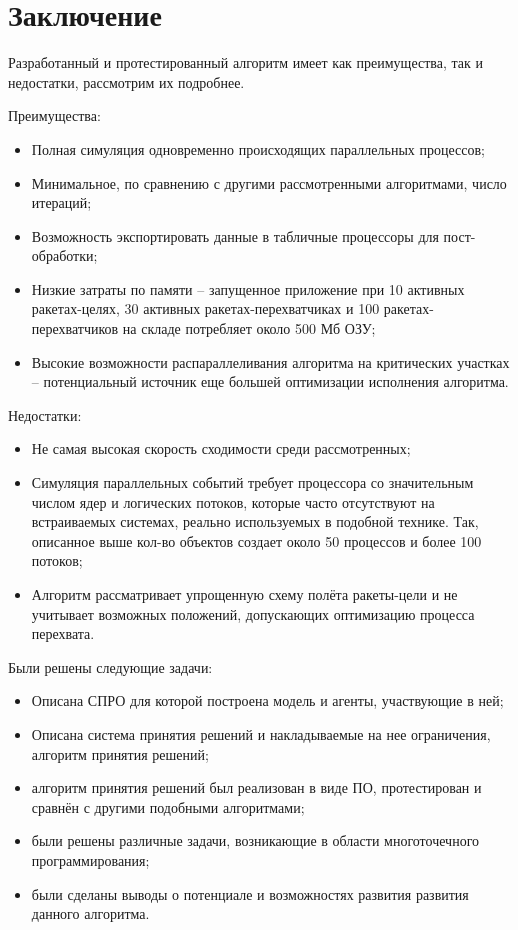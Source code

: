 \newpage
\parindent=1cm %
\section*{Заключение} %

Разработанный и протестированный алгоритм имеет как преимущества, так и недостатки, рассмотрим их подробнее.


Преимущества: \\
\begin{itemize}
	\item Полная симуляция одновременно происходящих параллельных процессов;
	\item Минимальное, по сравнению с другими рассмотренными алгоритмами, число итераций;
	\item Возможность экспортировать данные в табличные процессоры для пост-обработки;
	\item Низкие затраты по памяти -- запущенное приложение при 10 активных ракетах-целях, 30 активных  ракетах-перехватчиках и 100 ракетах-перехватчиков на складе потребляет около 500 Мб ОЗУ;
	\item Высокие возможности распараллеливания алгоритма на критических участках -- потенциальный источник еще большей оптимизации исполнения алгоритма.
\end{itemize}

Недостатки: \\
\begin{itemize}
	\item Не самая высокая скорость сходимости среди рассмотренных;
	\item Симуляция параллельных событий требует процессора со значительным числом ядер и логических потоков, которые часто отсутствуют на встраиваемых системах, реально используемых в подобной технике. Так, описанное выше кол-во объектов создает около 50 процессов и более 100 потоков;
	\item Алгоритм рассматривает упрощенную схему полёта ракеты-цели и не учитывает возможных положений, допускающих оптимизацию процесса перехвата.
\end{itemize}

Были решены следующие задачи:

\begin{itemize}
	\item Описана СПРО для которой  построена модель и агенты, участвующие в ней;
	\item Описана система принятия решений и накладываемые на нее ограничения, алгоритм принятия решений;
	\item алгоритм принятия решений был реализован в виде ПО, протестирован и сравнён с другими подобными алгоритмами;
	\item были решены различные задачи, возникающие в области многоточечного программирования;
	\item были сделаны выводы о потенциале и возможностях развития развития данного алгоритма.
\end{itemize}

